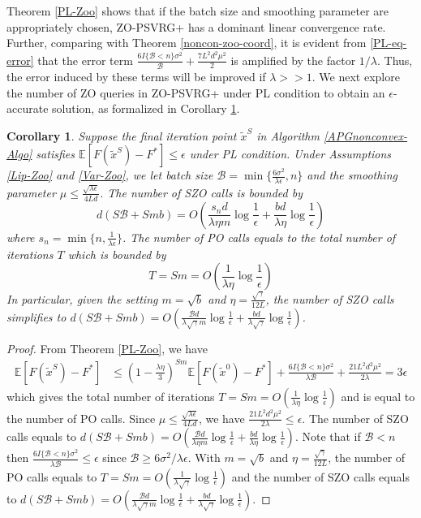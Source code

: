 \documentclass{article}
\newcommand*{\E}{\mathbb{E}}
\newtheorem{corollary}[theorem]{Corollary}
\theoremstyle{definition}
\theoremstyle{remark}
\begin{document}
Theorem \ref{PL-Zoo} shows that if the batch size and smoothing parameter are  appropriately chosen, ZO-PSVRG+ has a dominant linear convergence rate. 
Further, comparing with Theorem \ref{noncon-zoo-coord}, it is evident from \eqref{PL-eq-error} that the  error term $\frac{6I\{\mathcal{B} < n\} \sigma ^2}{\mathcal{B}}+\frac{7L^2 d^2 \mu^2}{2}$ is amplified by the factor $1/\lambda$. Thus, the error induced by these terms will be improved if $\lambda >> 1$. We next explore the number of ZO queries in ZO-PSVRG+ under PL condition to obtain an $\epsilon$-accurate solution, as formalized in Corollary \ref{PL-Zo-Cor}. 
\begin{corollary}\label{PL-Zo-Cor}
Suppose the final iteration point $\tilde{x}^S$ in Algorithm \ref{APGnonconvex-Algo} satisfies $\E[F(\tilde{x}^S) - F^*]\leq \epsilon$ under PL condition. Under Assumptions \ref{Lip-Zoo} and \ref{Var-Zoo}, we let batch size $\mathcal{B} = \min\{\frac{6\sigma^2}{\lambda\epsilon},n\}$ and the smoothing parameter $\mu \leq \frac{\sqrt{\lambda\epsilon}}{4 L d}$. The number of SZO calls is bounded by
\[
d(S\mathcal{B}+Smb) = O(\frac{s_n d}{\lambda\eta m}\log\frac{1}{\epsilon}+\frac{b d}{\lambda\eta}\log\frac{1}{\epsilon})
\]
where $s_n = \min \{n,\frac{1}{\lambda \epsilon}\}$.
The number of PO calls equals to the total number of iterations $T$ which is bounded by
\[
 T = Sm = O(\frac{1}{\lambda\eta}\log\frac{1}{\epsilon})
\]
In particular, given the setting  $m=\sqrt{b}$ and $\eta = \frac{\sqrt{\gamma}}{12 L}$, the number of SZO calls  simplifies to 
$d(S\mathcal{B}+Smb) = O(\frac{\mathcal{B}d}{\lambda\sqrt{\gamma} m}\log\frac{1}{\epsilon}+\frac{bd}{\lambda\sqrt{\gamma}}\log\frac{1}{\epsilon})$.
\end{corollary}
\begin{proof}
From Theorem \ref{PL-Zoo}, we have
\begin{align}
\E[F(\tilde{x}^S) - {F}^*] & \leq   \left(1-\frac{\lambda\eta}{3}\right)^{Sm} \E[F(\tilde{x}^0) - {F}^*] + \frac{6I\{\mathcal{B} < n\} \sigma ^2}{\lambda\mathcal{B}}+\frac{21 L^2 d^2 \mu^2}{2\lambda}= 3 \epsilon
\end{align}
which gives the total number of iterations $T = Sm = O(\frac{1}{\lambda\eta}\log\frac{1}{\epsilon})$ and is equal to the number of PO calls. Since $\mu \leq \frac{\sqrt{\lambda\epsilon}}{4 L d}$, we have $\frac{21 L^2 d^2 \mu^2}{2\lambda} \leq \epsilon$. The number of SZO calls equals to $d(S\mathcal{B}+Smb) = O(\frac{\mathcal{B}d}{\lambda\eta m}\log\frac{1}{\epsilon}+\frac{bd}{\lambda\eta}\log\frac{1}{\epsilon})$.  Note that if $\mathcal{B} < n$ then $\frac{6I\{\mathcal{B} < n\} \sigma ^2}{\lambda\mathcal{B}} \leq \epsilon$ since $\mathcal{B} \geq 6 {\sigma ^2}/{\lambda \epsilon}$. With $m=\sqrt{b}$ and $\eta = \frac{\sqrt{\gamma}}{12 L}$, the number of PO calls equals to $T = Sm = O(\frac{1}{\lambda\sqrt{\gamma}}\log\frac{1}{\epsilon})$ and the number of SZO calls equals to $d(S\mathcal{B}+Smb) = O(\frac{\mathcal{B}d}{\lambda\sqrt{\gamma} m}\log\frac{1}{\epsilon}+\frac{bd}{\lambda\sqrt{\gamma}}\log\frac{1}{\epsilon})$.
\end{proof}
\end{document}
